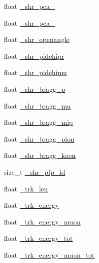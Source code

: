 \begin{DoxyCompactItemize}
\item 
float \hyperlink{classselection_1_1NuMuSelection_a7b9ce353bdf801c126b949d2ababcdef}{\-\_\-shr\-\_\-pca\-\_}
\item 
float \hyperlink{classselection_1_1NuMuSelection_af4069f6356b76cbfb2b2657e70961b63}{\-\_\-shr\-\_\-pca\-\_}
\item 
float \hyperlink{classselection_1_1NuMuSelection_ae0b0231c9373f62ab299817893c3d5f4}{\-\_\-shr\-\_\-openangle}
\item 
float \hyperlink{classselection_1_1NuMuSelection_aaf417a519bc8ecc0d965ac58aff47417}{\-\_\-shr\-\_\-pidchipr}
\item 
float \hyperlink{classselection_1_1NuMuSelection_aba9f56f7c16447322e3108dc91bc3ff0}{\-\_\-shr\-\_\-pidchimu}
\item 
float \hyperlink{classselection_1_1NuMuSelection_af7b55d564aef645da1ff8a1fa0b4e620}{\-\_\-shr\-\_\-bragg\-\_\-p}
\item 
float \hyperlink{classselection_1_1NuMuSelection_aea36ed7e354b16fc1e5ff97cedb23c47}{\-\_\-shr\-\_\-bragg\-\_\-mu}
\item 
float \hyperlink{classselection_1_1NuMuSelection_a418742070b70e6cd789a9dce1572c918}{\-\_\-shr\-\_\-bragg\-\_\-mip}
\item 
float \hyperlink{classselection_1_1NuMuSelection_a965ff03e4cd45fa4a7267f2c4576c99e}{\-\_\-shr\-\_\-bragg\-\_\-pion}
\item 
float \hyperlink{classselection_1_1NuMuSelection_a32142048875e97db40e44f0b4a51eae3}{\-\_\-shr\-\_\-bragg\-\_\-kaon}
\item 
size\-\_\-t \hyperlink{classselection_1_1NuMuSelection_a6a877911df0beda5d7d43149d0535389}{\-\_\-shr\-\_\-pfp\-\_\-id}
\item 
float \hyperlink{classselection_1_1NuMuSelection_ab8df38bd822646f56b672b4f942930a3}{\-\_\-trk\-\_\-len}
\item 
float \hyperlink{classselection_1_1NuMuSelection_a505f81bb9d920d0304d988a2f3fadbc2}{\-\_\-trk\-\_\-energy}
\item 
float \hyperlink{classselection_1_1NuMuSelection_ae223aabae94fb80e1e72b1392ceca16d}{\-\_\-trk\-\_\-energy\-\_\-muon}
\item 
float \hyperlink{classselection_1_1NuMuSelection_a62638e6a70986b1b5ae81a3cd80e4dc3}{\-\_\-trk\-\_\-energy\-\_\-tot}
\item 
float \hyperlink{classselection_1_1NuMuSelection_a09df11b06bf52eef27b8c748707ad991}{\-\_\-trk\-\_\-energy\-\_\-muon\-\_\-tot}
\item 

\end{DoxyCompactItemize}
